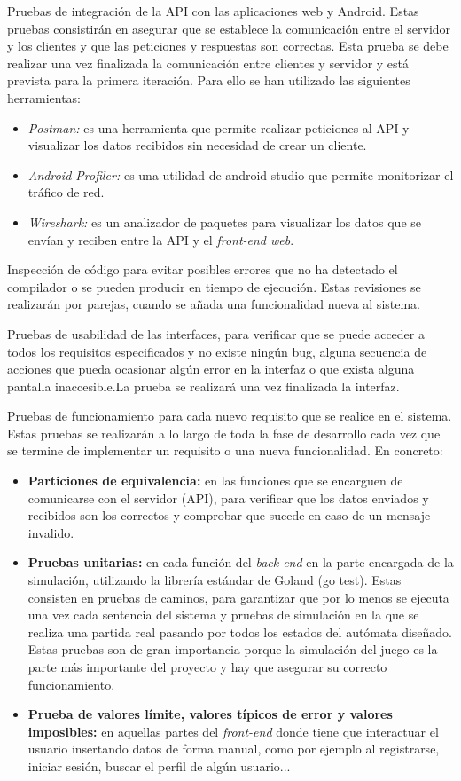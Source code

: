\documentclass{article}
\begin{document}
Pruebas de integración de la API con las aplicaciones web y Android. Estas pruebas consistirán en asegurar que se establece la comunicación entre el servidor y los clientes y que las peticiones y respuestas son correctas. Esta prueba se debe realizar una vez finalizada la comunicación entre clientes y servidor y está prevista para la primera iteración. Para ello se han utilizado las siguientes herramientas:
\begin{itemize}
	\item \textit{Postman:} es una herramienta que permite realizar peticiones al API y visualizar los datos recibidos sin necesidad de crear un cliente.
	\item \textit{Android Profiler:} es una utilidad de android studio que permite monitorizar el tráfico de red. 
	\item \textit{Wireshark:} es un analizador de paquetes para visualizar los datos que se envían y reciben entre la API y el \textit{front-end web}. 
\end{itemize}  

Inspección de código para evitar posibles errores que no ha detectado el compilador o se pueden producir en tiempo de ejecución. Estas revisiones se realizarán por parejas, cuando se añada una funcionalidad nueva al sistema.

Pruebas de usabilidad de las interfaces, para verificar que se puede acceder a todos los requisitos especificados y no existe ningún bug, alguna secuencia de acciones que pueda ocasionar algún error en la interfaz o que exista alguna pantalla inaccesible.La prueba se realizará una vez finalizada la interfaz.

Pruebas de funcionamiento para cada nuevo requisito que se realice en el sistema. Estas pruebas se realizarán a lo largo de toda la fase de desarrollo cada vez que se termine de implementar un requisito o una nueva funcionalidad. En concreto:
\begin{itemize}
	\item \textbf{Particiones de equivalencia:} en las funciones que se encarguen de comunicarse con el servidor (API), para verificar que los datos enviados y recibidos son los correctos y comprobar que sucede en caso de un mensaje invalido.
	\item \textbf{Pruebas unitarias:} en cada función del \textit{back-end} en la parte encargada de la simulación, utilizando la librería estándar de Goland (go test). Estas consisten en pruebas de caminos, para garantizar que por lo menos se ejecuta una vez cada sentencia del sistema y pruebas de simulación en la que se realiza una partida real pasando por todos los estados del autómata diseñado. Estas pruebas son de gran importancia porque la simulación del juego es la parte más importante del proyecto y hay que asegurar su correcto funcionamiento.  
	\item \textbf{Prueba de valores límite, valores típicos de error y valores imposibles:} en aquellas partes del \textit{front-end} donde tiene que interactuar el usuario insertando datos de forma manual, como por ejemplo al registrarse, iniciar sesión, buscar el perfil de algún usuario...
\end{itemize}
\end{document}
